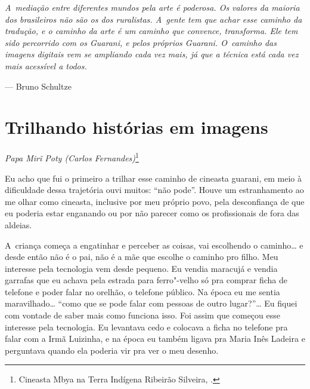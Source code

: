 \clearpage

\vspace*{\fill}

\begin{flushright}
\begin{minipage}[c]{0.85\textwidth}
\raggedleft
\footnotesize
\emph{A~mediação entre diferentes mundos pela arte é poderosa. Os valores da
maioria dos brasileiros não são os dos ruralistas. A~gente tem que
achar esse caminho da tradução, e o caminho da arte é um caminho que
convence, transforma. Ele tem sido percorrido com os Guarani, e pelos
próprios Guarani. O~caminho das imagens digitais vem se ampliando cada
vez mais, já que a técnica está cada vez mais acessível a todos.}

\smallskip
\hspace*{\fill}--- Bruno Schultze
\end{minipage}
\end{flushright}

\thispagestyle{empty}

\chapter*{Trilhando histórias em imagens}


\begin{flushright}
\emph{Papa Mirĩ Poty (Carlos Fernandes)}\footnote{Cineasta Mbya
na Terra Indígena Ribeirão Silveira, .}
\end{flushright}
\medskip

\noindent Eu acho que fui o primeiro a trilhar esse caminho de cineasta guarani,
em meio à dificuldade dessa trajetória ouvi muitos: ``não pode''. Houve
um estranhamento ao me olhar como cineasta, inclusive por meu próprio
povo, pela desconfiança de que eu poderia estar enganando ou por não
parecer como os profissionais de fora das aldeias.

A~criança começa a engatinhar e perceber as coisas, vai escolhendo o
caminho\ldots{} e desde então não é o pai, não é a mãe que escolhe o caminho
pro filho. Meu interesse pela tecnologia vem desde pequeno. Eu vendia
maracujá e vendia garrafas que eu achava pela estrada para ferro"-velho
só pra comprar ficha de telefone e poder falar no orelhão, o telefone
público. Na época eu me sentia maravilhado\ldots{} ``como que se pode falar
com pessoas de outro lugar?''\ldots{} Eu fiquei com vontade de saber mais
como funciona isso. Foi assim que começou esse interesse pela
tecnologia. Eu levantava cedo e colocava a ficha no telefone pra falar
com a Irmã Luizinha, e na época eu também ligava pra Maria Inês Ladeira
e perguntava quando ela poderia vir pra ver o meu desenho. 

